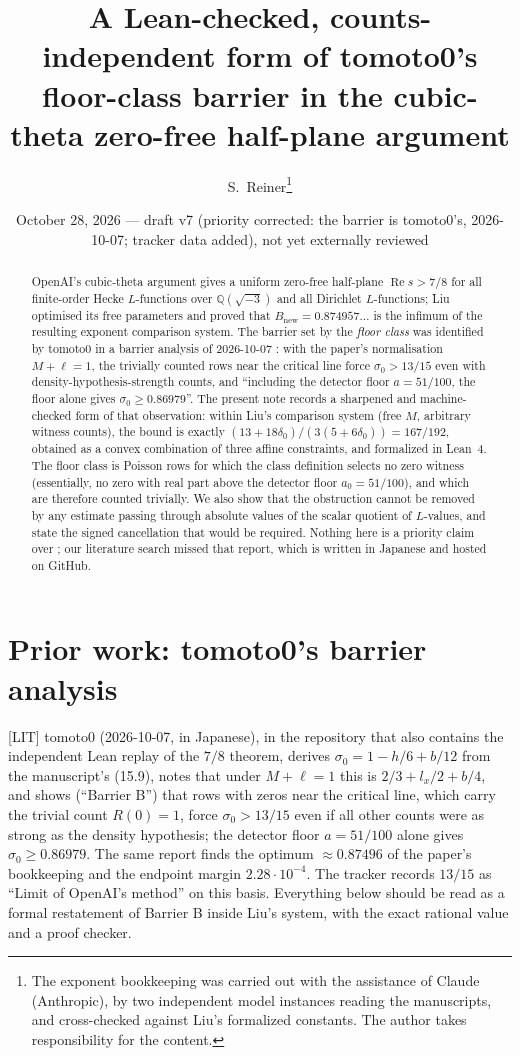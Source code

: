 \documentclass[11pt]{article}
\title{A Lean-checked, counts-independent form of tomoto0's floor-class barrier in the cubic-theta zero-free half-plane argument}
\author{S.~Reiner\thanks{The exponent bookkeeping was carried out with the assistance of Claude (Anthropic), by two independent model instances reading the manuscripts, and cross-checked against Liu's formalized constants. The author takes responsibility for the content.}}
\date{October 28, 2026 --- draft v7 (priority corrected: the barrier is tomoto0's, 2026-10-07; tracker data added), not yet externally reviewed}
\renewcommand{\Re}{\operatorname{Re}}
\begin{document}
\maketitle

\begin{abstract}
OpenAI's cubic-theta argument gives a uniform zero-free half-plane $\Re s>7/8$ for all finite-order Hecke $L$-functions over $\mathbb Q(\sqrt{-3})$ and all Dirichlet $L$-functions; Liu optimised its free parameters and proved that $B_{\mathrm{new}}=0.874957\ldots$ is the infimum of the resulting exponent comparison system. The barrier set by the \emph{floor class} was identified by tomoto0 in a barrier analysis of 2026-10-07 \cite{Tom26}: with the paper's normalisation $M+\ell=1$, the trivially counted rows near the critical line force $\sigma_0>13/15$ even with density-hypothesis-strength counts, and ``including the detector floor $a=51/100$, the floor alone gives $\sigma_0\ge0.86979$''. The present note records a sharpened and machine-checked form of that observation: within Liu's comparison system (free $M$, arbitrary witness counts), the bound is exactly $(13+18\delta_0)/(3(5+6\delta_0))=167/192$, obtained as a convex combination of three affine constraints, and formalized in Lean~4. The floor class is Poisson rows for which the class definition selects no zero witness (essentially, no zero with real part above the detector floor $a_0=51/100$), and which are therefore counted trivially. We also show that the obstruction cannot be removed by any estimate passing through absolute values of the scalar quotient of $L$-values, and state the signed cancellation that would be required. Nothing here is a priority claim over \cite{Tom26}; our literature search missed that report, which is written in Japanese and hosted on GitHub.
\end{abstract}

\section{Prior work: tomoto0's barrier analysis}
[LIT] tomoto0 \cite{Tom26} (2026-10-07, in Japanese), in the repository that also contains the independent Lean replay of the $7/8$ theorem, derives $\sigma_0=1-h/6+b/12$ from the manuscript's (15.9), notes that under $M+\ell=1$ this is $2/3+l_x/2+b/4$, and shows (``Barrier B'') that rows with zeros near the critical line, which carry the trivial count $R(0)=1$, force $\sigma_0>13/15$ even if all other counts were as strong as the density hypothesis; the detector floor $a=51/100$ alone gives $\sigma_0\ge0.86979$. The same report finds the optimum $\approx0.87496$ of the paper's bookkeeping and the endpoint margin $2.28\cdot10^{-4}$. The tracker \cite{Tracker} records $13/15$ as ``Limit of OpenAI's method'' on this basis. Everything below should be read as a formal restatement of Barrier B inside Liu's system, with the exact rational value and a proof checker.
\end{document}

